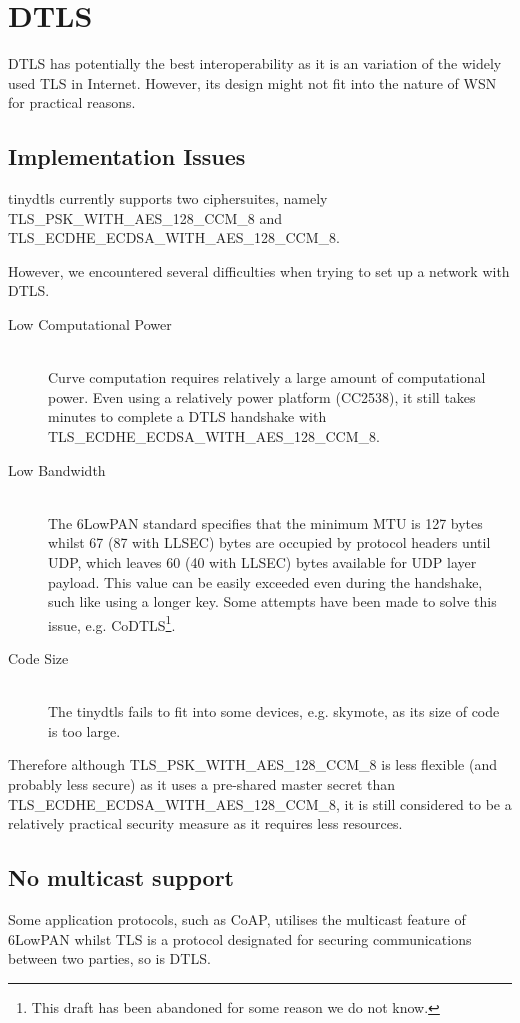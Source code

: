 \chapter{DTLS}
DTLS has potentially the best interoperability as it is an variation of the widely used TLS in Internet. However, its design might not fit into the nature of WSN for practical reasons.

\section{Implementation Issues}
tinydtls\cite{tinydtls} currently supports two ciphersuites, namely TLS\_PSK\_WITH\_AES\_128\_CCM\_8 and TLS\_ECDHE\_ECDSA\_WITH\_AES\_128\_CCM\_8. 

However, we encountered several difficulties when trying to set up a  network with DTLS.

\begin{description}
\item[Low Computational Power] \hfill \\
Curve computation requires relatively a large amount of computational power. Even using a relatively power platform (CC2538), it still takes minutes to complete a DTLS handshake with
TLS\_ECDHE\_ECDSA\_WITH\_AES\_128\_CCM\_8.

\item[Low Bandwidth] \hfill \\
The 6LowPAN standard specifies that the minimum MTU is 127 bytes whilst 67 (87 with LLSEC) bytes are occupied by protocol headers until UDP, which leaves 60 (40 with LLSEC) bytes available for UDP layer payload. This value can be easily exceeded even during the handshake, such like using a longer key. Some attempts have been made to solve this issue, e.g. CoDTLS\cite{CoDTLS}\footnote{This draft has been abandoned for some reason we do not know.}.

\item[Code Size] \hfill \\
The tinydtls fails to fit into some devices, e.g. skymote, as its size of code is too large.
\end{description}

Therefore although TLS\_PSK\_WITH\_AES\_128\_CCM\_8 is less flexible (and probably less secure) as it uses a pre-shared master secret than TLS\_ECDHE\_ECDSA\_WITH\_AES\_128\_CCM\_8, it is still considered to be a relatively practical security measure as it requires less resources.

\section{No multicast support}
Some application protocols, such as CoAP, utilises the multicast feature of 6LowPAN whilst TLS is a protocol designated for securing communications between two parties, so is DTLS.

